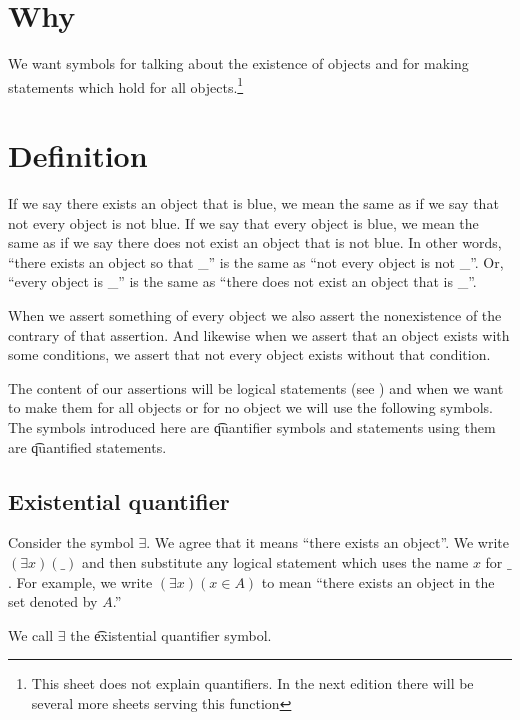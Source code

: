 
\section*{Why}

We want symbols for talking about the existence of objects and for making statements which hold for all objects.\footnote{This sheet does not explain quantifiers. In the next edition there will be several more sheets serving this function}

\section*{Definition}

If we say there exists an object that is blue, we mean the same as if we say that not every object is not blue.
If we say that every object is blue, we mean the same as if we say there does not exist an object that is not blue.
In other words, ``there exists an object so that \_'' is the same as ``not every object is not \_''.
Or, ``every object is \_'' is the same as ``there does not exist an object that is \_''.

When we assert something of every object we also assert the nonexistence of the contrary of that assertion.
And likewise when we assert that an object exists with some conditions, we assert that not every object exists without that condition.

The content of our assertions will be logical statements (see ) and when we want to make them for all objects or for no object we will use the following symbols.
The symbols introduced here are \t{quantifier symbols} and statements using them are \t{quantified statements}.

\subsection*{Existential quantifier}

Consider the symbol $\exists $.
We agree that it means ``there exists an object''.
We write $(\exists x)(\_)$ and then substitute any logical statement which uses the name $x$ for $\_$ .
For example, we write $(\exists x)(x \in A)$ to mean ``there exists an object in the set denoted by $A$.''
%  

We call $\exists $ the \t{existential quantifier} symbol.

